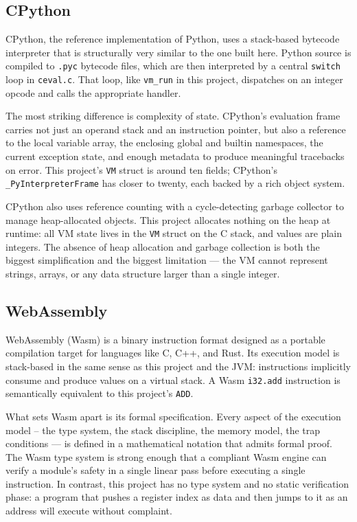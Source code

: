 \subsection{CPython}

CPython, the reference implementation of Python, uses a stack-based bytecode interpreter that is structurally very similar to the one built here. Python source is compiled to \texttt{.pyc} bytecode files, which are then interpreted by a central \texttt{switch} loop in \texttt{ceval.c}. That loop, like \texttt{vm\_run} in this project, dispatches on an integer opcode and calls the appropriate handler.

The most striking difference is complexity of state. CPython's evaluation frame carries not just an operand stack and an instruction pointer, but also a reference to the local variable array, the enclosing global and builtin namespaces, the current exception state, and enough metadata to produce meaningful tracebacks on error. This project's \texttt{VM} struct is around ten fields; CPython's \texttt{\_PyInterpreterFrame} has closer to twenty, each backed by a rich object system.

CPython also uses reference counting \cite{ReferenceCount} with a cycle-detecting garbage collector \cite{GarbageCollection} to manage heap-allocated objects. This project allocates nothing on the heap at runtime: all VM state lives in the \texttt{VM} struct on the C stack, and values are plain integers. The absence of heap allocation and garbage collection is both the biggest simplification and the biggest limitation — the VM cannot represent strings, arrays, or any data structure larger than a single integer.

\subsection{WebAssembly}

WebAssembly (Wasm) is a binary instruction format designed as a portable compilation target for languages like C, C++, and Rust. Its execution model is stack-based in the same sense as this project and the JVM: instructions implicitly consume and produce values on a virtual stack. A Wasm \texttt{i32.add} instruction is semantically equivalent to this project's \texttt{ADD}.

What sets Wasm apart is its formal specification. Every aspect of the execution model – the type system, the stack discipline, the memory model, the trap conditions — is defined in a mathematical notation that admits formal proof. The Wasm type system is strong enough that a compliant Wasm engine can verify a module's safety in a single linear pass before executing a single instruction. In contrast, this project has no type system and no static verification phase: a program that pushes a register index as data and then jumps to it as an address will execute without complaint.

